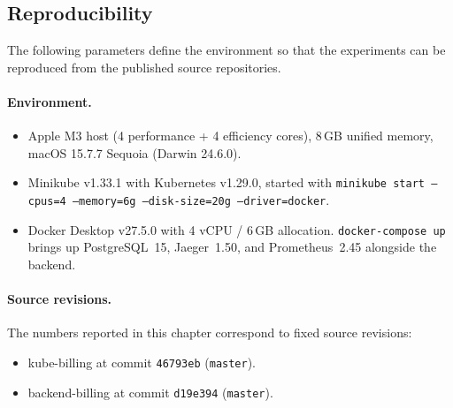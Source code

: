 \subsection{Reproducibility}\label{sec:reproducibility}

The following parameters define the environment so that the experiments can be reproduced from the published source repositories.

\paragraph{Environment.}
\begin{itemize}
    \item Apple M3 host (4 performance + 4 efficiency cores), 8\,GB unified memory, macOS 15.7.7 Sequoia (Darwin 24.6.0).
    \item Minikube v1.33.1 with Kubernetes v1.29.0, started with \texttt{minikube start --cpus=4 --memory=6g --disk-size=20g --driver=docker}.
    \item Docker Desktop v27.5.0 with 4 vCPU / 6\,GB allocation. \texttt{docker-compose up} brings up PostgreSQL~15, Jaeger~1.50, and Prometheus~2.45 alongside the backend.
\end{itemize}

\paragraph{Source revisions.}
The numbers reported in this chapter correspond to fixed source revisions:
\begin{itemize}
    \item kube-billing at commit \texttt{46793eb} (\texttt{master}).
    \item backend-billing at commit \texttt{d19e394} (\texttt{master}).
\end{itemize}


